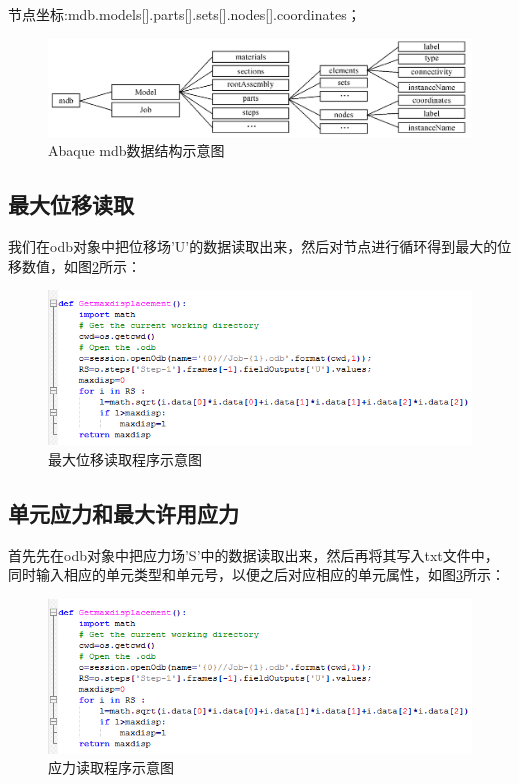 \documentclass[forprint]{WHUBachelor}
\begin{document}
节点坐标:mdb.models{[}{]}.parts{[}{]}.sets{[}{]}.nodes{[}{]}.coordinates；

\begin{figure}[H]
\centering  
\includegraphics[width = .8\textwidth]{3.png} 
\caption{Abaque mdb数据结构示意图} 
\label{4-3} 
\end{figure}

\subsection{最大位移读取}

我们在odb对象中把位移场’U’的数据读取出来，然后对节点进行循环得到最大的位移数值，如图\ref{4-4}所示：

\begin{figure}[H]
\centering  
\includegraphics[width = .8\textwidth]{4.png} 
\caption{最大位移读取程序示意图} 
\label{4-4} 
\end{figure}

\subsection{单元应力和最大许用应力}

首先先在odb对象中把应力场’S’中的数据读取出来，然后再将其写入txt文件中，同时输入相应的单元类型和单元号，以便之后对应相应的单元属性，如图\ref{4-5}所示：

\begin{figure}[H]
\centering  
\includegraphics[width = .8\textwidth]{4.png} 
\caption{应力读取程序示意图} 
\label{4-5} 
\end{figure}
\end{document}

